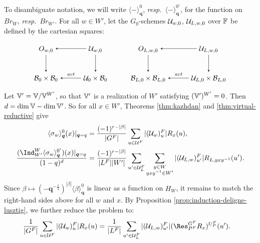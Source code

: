 \documentclass[a4paper,10pt,leqno]{amsart}
\theoremstyle{plain}
\theoremstyle{plain}
\theoremstyle{plain}
\theoremstyle{definition}
\theoremstyle{remark}
\newcommand{\Br}{\mathit{Br}}
\newcommand{\Q}{\bm{q}}
\newcommand{\Tr}[1]{\langle{#1}\rangle_{\Q}}
\newcommand{\act}{\mathit{act}}
\begin{document}
To disambiguate notation, we will write $\Tr{-}^0$, \emph{resp.}\ $\Tr{-}^{0'}$, for the function on $\Br_W$, \emph{resp.}\ $\Br_{W'}$.
For all $w \in W'$, let the $G_0$-schemes $\cal{U}_{w, 0}$, $\cal{U}_{L, w, 0}$ over $\bb{F}$ be defined by the cartesian squares:
\begin{equation}
\begin{tikzpicture}[baseline=(current bounding box.center), >=stealth]
\matrix(m)[matrix of math nodes, row sep=2.5em, column sep=3em, text height=2ex, text depth=0.5ex]
{	O_{w, 0}
		&\cal{U}_{w, 0}\\
	\cal{B}_0 \times \cal{B}_0
		&\cal{U}_0 \times \cal{B}_0\\
		};
\path[->,font=\scriptsize, auto]
(m-1-2)		edge (m-1-1)
			edge (m-2-2)
(m-1-1) 	edge (m-2-1)
(m-2-2) 	edge node[above]{$\act$} (m-2-1);
\end{tikzpicture}
\qquad
\begin{tikzpicture}[baseline=(current bounding box.center), >=stealth]
\matrix(m)[matrix of math nodes, row sep=2.5em, column sep=3em, text height=2ex, text depth=0.5ex]
{	O_{L, w, 0}
		&\cal{U}_{L, w, 0}\\
	\cal{B}_{L, 0} \times \cal{B}_{L, 0}
		&\cal{U}_{L, 0} \times \cal{B}_{L, 0}\\
		};
\path[->,font=\scriptsize, auto]
(m-1-2)		edge (m-1-1)
			edge (m-2-2)
(m-1-1) 	edge (m-2-1)
(m-2-2) 	edge node[above]{$\act$} (m-2-1);
\end{tikzpicture}
\end{equation}
Let $\bb{V}' = \bb{V}/\bb{V}^{W'}$, so that $\bb{V}'$ is a realization of $W'$ satisfying $(\bb{V}')^{W'} = 0$.
Then $d = \dim \bb{V} - \dim \bb{V}'$.
So for all $x \in W'$, Theorems \ref{thm:kazhdan} and \ref{thm:virtual-reductive} give
\begin{align}
\Tr{\sigma_w}^0(x)|_{\Q = q}
&=	\frac{(-1)^{r - |\beta|}}{|G^F|}
	\sum_{u \in \cal{U}^F} 
	|(\cal{U}_w)_u^F| R_x(u),\\
\frac{(\Ind_{W'}^W \Tr{\sigma_w}^{0'})(x)|_{\Q = q}}{(1 - q)^d}
&=	\frac{(-1)^{r - |\beta|}}{|L^F||W'|}
	\sum_{u' \in \cal{U}_L^F} 
	\sum_{\substack{y \in W \\ yxy^{-1} \in W'}}
	|(\cal{U}_{L, w})_{u'}^F| 
	R_{L, yxy^{-1}}(u').
\end{align}
Since $\beta \mapsto {(-\Q^{-\frac{1}{2}})^{|\beta|}}\Tr{\beta}^0$ is linear as a function on $H_W$, it remains to match the right-hand sides above for all $w$ and $x$.
By Proposition \ref{prop:induction-deligne-lusztig}, we further reduce the problem to:
\begin{align}\label{eq:l-to-g}
\frac{1}{|G^F|}
	\sum_{u \in \cal{U}^F} 
	|(\cal{U}_w)_u^F| R_x(u)
&=	
	\frac{1}{|L^F|}
	\sum_{u' \in \cal{U}_L^F} 
	|(\cal{U}_{L, w})_{u'}^F| 
	(\Res_{P^F}^{G^F} R_x)^{U_P^F}(u').
\end{align}
\end{document}
